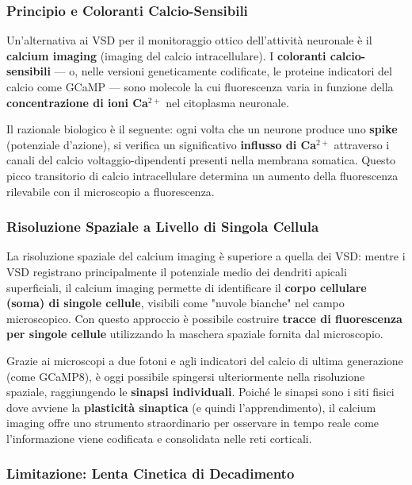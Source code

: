 \subsubsection{Principio e Coloranti Calcio-Sensibili}

Un'alternativa ai VSD per il monitoraggio ottico dell'attività neuronale è il \textbf{calcium imaging} (imaging del calcio intracellulare). I \textbf{coloranti calcio-sensibili} — o, nelle versioni geneticamente codificate, le proteine indicatori del calcio come GCaMP — sono molecole la cui fluorescenza varia in funzione della \textbf{concentrazione di ioni Ca$^{2+}$} nel citoplasma neuronale.

Il razionale biologico è il seguente: ogni volta che un neurone produce uno \textbf{spike} (potenziale d'azione), si verifica un significativo \textbf{influsso di Ca$^{2+}$} attraverso i canali del calcio voltaggio-dipendenti presenti nella membrana somatica. Questo picco transitorio di calcio intracellulare determina un aumento della fluorescenza rilevabile con il microscopio a fluorescenza.

\subsubsection{Risoluzione Spaziale a Livello di Singola Cellula}

La risoluzione spaziale del calcium imaging è superiore a quella dei VSD: mentre i VSD registrano principalmente il potenziale medio dei dendriti apicali superficiali, il calcium imaging permette di identificare il \textbf{corpo cellulare (soma) di singole cellule}, visibili come "nuvole bianche" nel campo microscopico. Con questo approccio è possibile costruire \textbf{tracce di fluorescenza per singole cellule}  utilizzando la maschera spaziale fornita dal microscopio.

Grazie ai microscopi a due fotoni e agli indicatori del calcio di ultima generazione (come GCaMP8), è oggi possibile spingersi ulteriormente nella risoluzione spaziale, raggiungendo le \textbf{sinapsi individuali}. Poiché le sinapsi sono i siti fisici dove avviene la \textbf{plasticità sinaptica} (e quindi l'apprendimento), il calcium imaging offre uno strumento straordinario per osservare in tempo reale come l'informazione viene codificata e consolidata nelle reti corticali.

\subsubsection{Limitazione: Lenta Cinetica di Decadimento}


